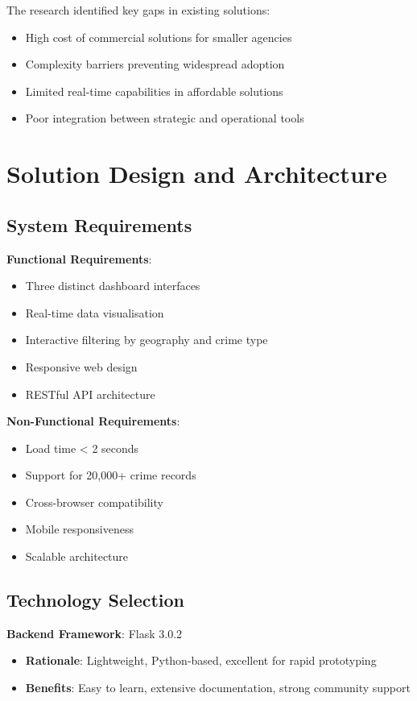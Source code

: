 \documentclass[12pt,a4paper]{article}
\begin{document}
The research identified key gaps in existing solutions:
\begin{itemize}
    \item High cost of commercial solutions for smaller agencies
    \item Complexity barriers preventing widespread adoption
    \item Limited real-time capabilities in affordable solutions
    \item Poor integration between strategic and operational tools
\end{itemize}

\section{Solution Design and Architecture}

\subsection{System Requirements}

\textbf{Functional Requirements}:
\begin{itemize}
    \item Three distinct dashboard interfaces
    \item Real-time data visualisation
    \item Interactive filtering by geography and crime type
    \item Responsive web design
    \item RESTful API architecture
\end{itemize}

\textbf{Non-Functional Requirements}:
\begin{itemize}
    \item Load time < 2 seconds
    \item Support for 20,000+ crime records
    \item Cross-browser compatibility
    \item Mobile responsiveness
    \item Scalable architecture
\end{itemize}

\subsection{Technology Selection}

\textbf{Backend Framework}: Flask 3.0.2
\begin{itemize}
    \item \textbf{Rationale}: Lightweight, Python-based, excellent for rapid prototyping
    \item \textbf{Benefits}: Easy to learn, extensive documentation, strong community support
\end{itemize}
\end{document}
